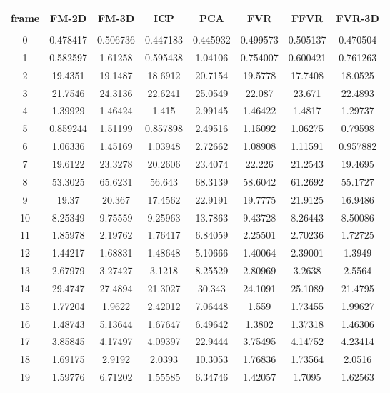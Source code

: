 \begin{center}
\begin{longtable}{cccccccc}
\hline \\
\textbf{frame} & \textbf{FM-2D} & \textbf{FM-3D} & \textbf{ICP} & \textbf{PCA} & \textbf{FVR} & \textbf{FFVR} & \textbf{FVR-3D} \\
\hline \\
0 & 0.478417 & 0.506736 & 0.447183 & 0.445932 & 0.499573 & 0.505137 & 0.470504\\
1 & 0.582597 & 1.61258 & 0.595438 & 1.04106 & 0.754007 & 0.600421 & 0.761263\\
2 & 19.4351 & 19.1487 & 18.6912 & 20.7154 & 19.5778 & 17.7408 & 18.0525\\
3 & 21.7546 & 24.3136 & 22.6241 & 25.0549 & 22.087 & 23.671 & 22.4893\\
4 & 1.39929 & 1.46424 & 1.415 & 2.99145 & 1.46422 & 1.4817 & 1.29737\\
5 & 0.859244 & 1.51199 & 0.857898 & 2.49516 & 1.15092 & 1.06275 & 0.79598\\
6 & 1.06336 & 1.45169 & 1.03948 & 2.72662 & 1.08908 & 1.11591 & 0.957882\\
7 & 19.6122 & 23.3278 & 20.2606 & 23.4074 & 22.226 & 21.2543 & 19.4695\\
8 & 53.3025 & 65.6231 & 56.643 & 68.3139 & 58.6042 & 61.2692 & 55.1727\\
9 & 19.37 & 20.367 & 17.4562 & 22.9191 & 19.7775 & 21.9125 & 16.9486\\
10 & 8.25349 & 9.75559 & 9.25963 & 13.7863 & 9.43728 & 8.26443 & 8.50086\\
11 & 1.85978 & 2.19762 & 1.76417 & 6.84059 & 2.25501 & 2.70236 & 1.72725\\
12 & 1.44217 & 1.68831 & 1.48648 & 5.10666 & 1.40064 & 2.39001 & 1.3949\\
13 & 2.67979 & 3.27427 & 3.1218 & 8.25529 & 2.80969 & 3.2638 & 2.5564\\
14 & 29.4747 & 27.4894 & 21.3027 & 30.343 & 24.1091 & 25.1089 & 21.4795\\
15 & 1.77204 & 1.9622 & 2.42012 & 7.06448 & 1.559 & 1.73455 & 1.99627\\
16 & 1.48743 & 5.13644 & 1.67647 & 6.49642 & 1.3802 & 1.37318 & 1.46306\\
17 & 3.85845 & 4.17497 & 4.09397 & 22.9444 & 3.75495 & 4.14752 & 4.23414\\
18 & 1.69175 & 2.9192 & 2.0393 & 10.3053 & 1.76836 & 1.73564 & 2.0516\\
19 & 1.59776 & 6.71202 & 1.55585 & 6.34746 & 1.42057 & 1.7095 & 1.62563\\

\end{longtable}
\end{center}
